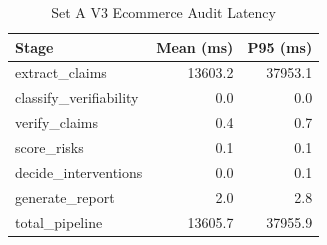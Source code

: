 \begin{table}[t]
\centering
\caption{Set A V3 Ecommerce Audit Latency}
\label{tab:latency}
\begin{tabular}{lrr}
\toprule
Stage & Mean (ms) & P95 (ms) \\
\midrule
extract\_claims & 13603.2 & 37953.1 \\
classify\_verifiability & 0.0 & 0.0 \\
verify\_claims & 0.4 & 0.7 \\
score\_risks & 0.1 & 0.1 \\
decide\_interventions & 0.0 & 0.1 \\
generate\_report & 2.0 & 2.8 \\
total\_pipeline & 13605.7 & 37955.9 \\
\bottomrule
\end{tabular}
\end{table}
